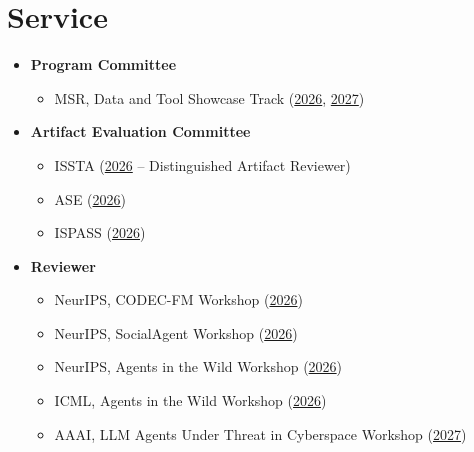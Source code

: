 \documentclass[letterpaper,10pt]{article}
\begin{document}
\section{Service}
{\normalsize
\begin{itemize}[leftmargin=0.15in, label={}, itemsep=0.4em]
  \item \textbf{Program Committee}
  \begin{itemize}[leftmargin=0.15in, label=\textbullet, itemsep=0pt]
    \item MSR, Data and Tool Showcase Track (\href{https://2026.msrconf.org/track/msr-2026-data-and-tool-showcase-track}{2026}, \href{https://2027.msrconf.org/track/msr-2027-data-and-tool-showcase-track}{2027})
  \end{itemize}
  \item \textbf{Artifact Evaluation Committee}
  \begin{itemize}[leftmargin=0.15in, label=\textbullet, itemsep=0pt]
    \item ISSTA (\href{https://conf.researchr.org/track/issta-2026/issta-2026-artifact-evaluation}{2026} -- Distinguished Artifact Reviewer)
    \item ASE (\href{https://conf.researchr.org/track/ase-2026/ase-2026-artifact-evaluation}{2026})
    \item ISPASS (\href{https://ispass.org/ispass2026/}{2026})
  \end{itemize}
  \item \textbf{Reviewer}
  \begin{itemize}[leftmargin=0.15in, label=\textbullet, itemsep=0pt]
    \item NeurIPS, CODEC-FM Workshop (\href{https://collaborative-open-decentralized-fomo.github.io/}{2026})
    \item NeurIPS, SocialAgent Workshop (\href{https://social-llm-workshop.github.io/}{2026})
    \item NeurIPS, Agents in the Wild Workshop (\href{https://agentwild-workshop.github.io/neurips2026/}{2026})
    \item ICML, Agents in the Wild Workshop (\href{https://agentwild-workshop.github.io/icml2026/}{2026})
    \item AAAI, LLM Agents Under Threat in Cyberspace Workshop (\href{https://llm-agents-under-threat.github.io/}{2027})
  \end{itemize}
\end{itemize}
}
\end{document}
